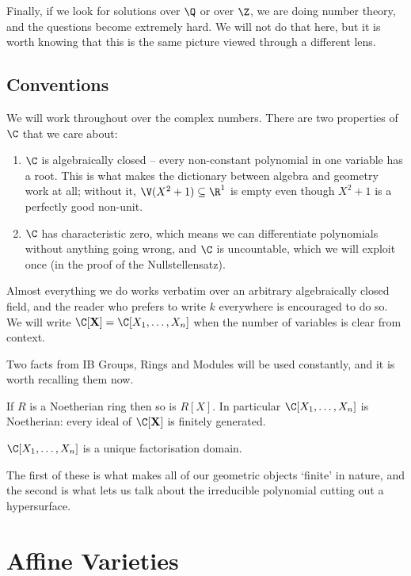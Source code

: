 Finally, if we look for solutions over $\Q$ or over $\Z$, we are doing number theory, and the questions become extremely hard. We will not do that here, but it is worth knowing that this is the same picture viewed through a different lens.

\subsection{Conventions}

We will work throughout over the complex numbers. There are two properties of $\C$ that we care about:
\begin{enumerate}[label=(\roman*)]
	\item $\C$ is algebraically closed -- every non-constant polynomial in one variable has a root. This is what makes the dictionary between algebra and geometry work at all; without it, $\V(X^2+1) \subseteq \R^1$ is empty even though $X^2+1$ is a perfectly good non-unit.
	\item $\C$ has characteristic zero, which means we can differentiate polynomials without anything going wrong, and $\C$ is uncountable, which we will exploit once (in the proof of the Nullstellensatz).
\end{enumerate}
Almost everything we do works verbatim over an arbitrary algebraically closed field, and the reader who prefers to write $k$ everywhere is encouraged to do so. We will write $\C[\mathbf{X}] = \C[X_1,\dots,X_n]$ when the number of variables is clear from context.

Two facts from IB Groups, Rings and Modules will be used constantly, and it is worth recalling them now.

\begin{theorem}
	If $R$ is a Noetherian ring then so is $R[X]$. In particular $\C[X_1,\dots,X_n]$ is Noetherian: every ideal of $\C[\mathbf{X}]$ is finitely generated.
\end{theorem}

\begin{theorem}
	$\C[X_1,\dots,X_n]$ is a unique factorisation domain.
\end{theorem}

The first of these is what makes all of our geometric objects `finite' in nature, and the second is what lets us talk about the irreducible polynomial cutting out a hypersurface.

\section{Affine Varieties}

